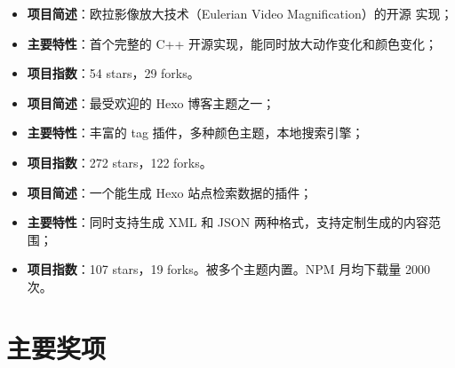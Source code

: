 %
  {
\begin{itemize}
\item \textbf{项目简述}：欧拉影像放大技术（Eulerian Video Magnification）的开源
  实现；
\item \textbf{主要特性}：首个完整的 C++ 开源实现，能同时放大动作变化和颜色变化；
\item \textbf{项目指数}：54 stars，29 forks。
\end{itemize}}

%
{
\begin{itemize}
\item \textbf{项目简述}：最受欢迎的 Hexo 博客主题之一；
\item \textbf{主要特性}：丰富的 tag 插件，多种颜色主题，本地搜索引擎；
\item \textbf{项目指数}：272 stars，122 forks。
\end{itemize}}

%
  {
\begin{itemize}
\item \textbf{项目简述}：一个能生成 Hexo 站点检索数据的插件；
\item \textbf{主要特性}：同时支持生成 XML 和
  JSON 两种格式，支持定制生成的内容范围；
\item \textbf{项目指数}：107 stars，19 forks。被多个主题内置。NPM 月均下载量 2000 次。
\end{itemize}}

\section{\hei 主要奖项}


